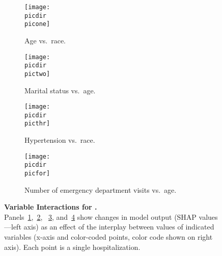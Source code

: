 \begin{figure}
\begin{adjustbox}{minipage=7.0in,frame}
\vspace{2.5mm}
\centering
%
\def\target{financialclass}
\def\targetname{Payer Class}
%
\def\picdir{supplementary/\target/}
%
\def\labbig{fig:insuranceint}
%
\def\picone{\target_SHAP_dependence_0.pdf}
\def\pictwo{\target_SHAP_dependence_1.pdf}
\def\picthr{\target_SHAP_dependence_5.pdf}
\def\picfor{\target_SHAP_dependence_7.pdf}
\def\capone{Age vs.\ race.}
\def\labone{fig:insuranceintagerace}
\def\captwo{Marital status vs.\ age.}
\def\labtwo{fig:insuranceintmarriedage}
\def\capthr{Hypertension vs.\ race.}
\def\labthr{fig:insuranceinthtnrace}
\def\capfor{Number of emergency department visits vs.\ age.}
\def\labfor{fig:insuranceintedage}
%
\def\capbig{\textbf{Variable Interactions for \titlecap{\targetname}.} \\ %
Panels~\ref{\labone},~\ref{\labtwo}, %
~\ref{\labthr}, and~\ref{\labfor} %
show changes in model output (SHAP values---left axis) %
as an effect of the interplay between %
values of indicated variables (x-axis and color-coded points, %
color code shown on right axis).\@
Each point is a single hospitalization.\@
}
%
%
\begin{subfigure}[t]{.45\linewidth}
    \centering
    \captionsetup[subfigure]{}
    \caption{\capone{}}\label{\labone}
    \texttt{[image: \\picdir\\picone]}
\end{subfigure}%
\hspace{5mm}%
\begin{subfigure}[t]{.45\linewidth}
    \centering
    \captionsetup[subfigure]{}
    \caption{\captwo}\label{\labtwo}
    \texttt{[image: \\picdir\\pictwo]}
\end{subfigure}%

\vspace{5mm}
\begin{subfigure}[t]{.45\linewidth}
    \centering
    \captionsetup[subfigure]{}
    \caption{\capthr}\label{\labthr}
    \texttt{[image: \\picdir\\picthr]}
\end{subfigure}%
\hspace{5mm}%
\begin{subfigure}[t]{.45\linewidth}
    \centering
    \captionsetup[subfigure]{}
    \caption{\capfor}\label{\labfor}
    \texttt{[image: \\picdir\\picfor]}
\end{subfigure}%

\caption{\capbig}\label{\labbig}
\end{adjustbox}
\end{figure}